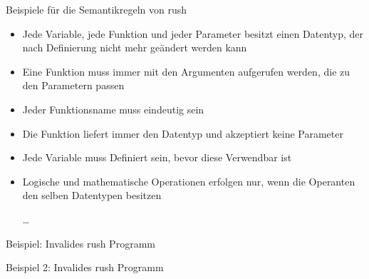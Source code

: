 \begin{frame}{Beispiele für die Semantikregeln von rush}
	\begin{itemize}
		\item Jede Variable, jede Funktion und jeder Parameter besitzt einen Datentyp, der nach Definierung nicht mehr geändert werden kann
		\item Eine Funktion muss immer mit den Argumenten aufgerufen werden, die zu den Parametern passen
		\item Jeder Funktionsname muss eindeutig sein
		\item Die  Funktion liefert immer den \qVerb{()} Datentyp und akzeptiert keine Parameter
		\item Jede Variable muss Definiert sein, bevor diese Verwendbar ist
		\item Logische und mathematische Operationen erfolgen nur, wenn die Operanten den selben Datentypen besitzen
		\item[\ldots]
	\end{itemize}
\end{frame}

\begin{frame}{Beispiel: Invalides rush Programm}
    \begin{minipage}{.5\textwidth}
    \end{minipage}%
    \begin{minipage}{.5\textwidth}
    \end{minipage}
\end{frame}

\begin{frame}{Beispiel 2: Invalides rush Programm}
    \begin{minipage}{.5\textwidth}
    \end{minipage}%
    \begin{minipage}{.5\textwidth}
    \end{minipage}
\end{frame}
